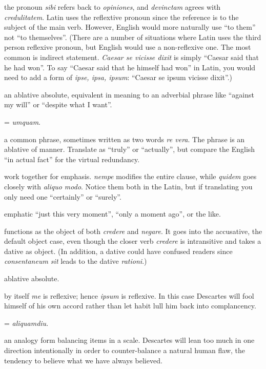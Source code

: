  the pronoun \textit{sibi} refers back to \textit{opiniones}, and \textit{devinctam} agrees with \textit{credulitatem}. Latin uses the reflextive pronoun since the reference is to the subject of the main verb. However, English would more naturally use ``to them'' not ``to themselves''. (There are a number of situations where Latin uses the third person reflexive pronoun, but English would use a non-reflexive one. The most common is indirect statement. \textit{Caesar se vicisse dixit} is simply ``Caesar said that he had won''. To say ``Caesar said that he himself had won'' in Latin, you would need to add a form of \textit{ipse, ipsa, ipsum}: ``Caesar se ipsum vicisse dixit''.)

 an ablative absolute, equivalent in meaning to an adverbial phrase like ``against my will'' or ``despite what I want''.

 = \textit{umquam}.

 a common phrase, sometimes written as two words \textit{re vera}. The phrase is an ablative of manner. Translate as ``truly'' or ``actually'', but compare the English ``in actual fact'' for the virtual redundancy.

 work together for emphasis. \textit{nempe} modifies the entire clause, while \textit{quidem} goes closely with \textit{aliquo modo}. Notice them both in the Latin, but if translating you only need one ``certainly'' or ``surely''.

 emphatic ``just this very moment'', ``only a moment ago'', or the like.

 functions as the object of both \textit{credere} and \textit{negare}. It goes into the accusative, the default object case, even though the closer verb \textit{credere} is intransitive and takes a dative as object. (In addition, a dative could have confused readers since \textit{consentaneum sit} leads to the dative \textit{rationi}.)

 ablative absolute.

 by itself \textit{me} is reflexive; hence \textit{ipsum} is reflexive. In this case Descartes will fool himself of his own accord rather than let habit lull him back into complancency.

 = \textit{aliquamdiu}. 

 an analogy form balancing items in a scale. Descartes will lean too much in one direction intentionally in order to counter-balance a natural human flaw, the tendency to believe what we have always believed.

